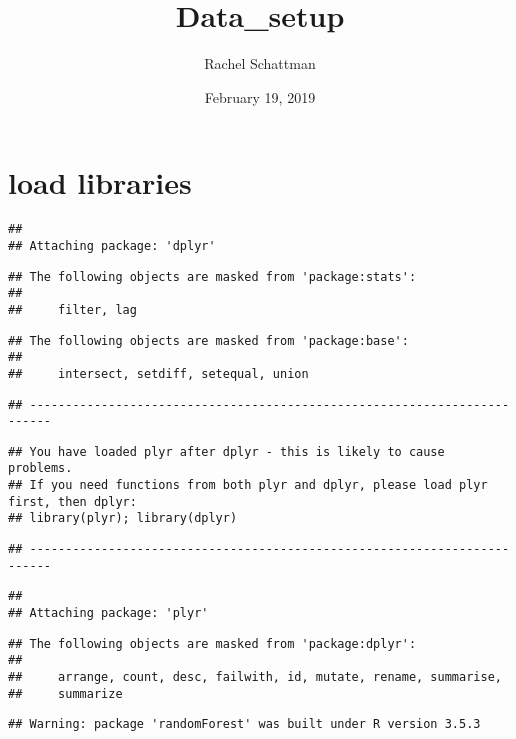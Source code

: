 \documentclass[]{article}
\title{Data\_setup}
\author{Rachel Schattman}
\date{February 19, 2019}
\begin{document}
\maketitle

\section{load libraries}\label{load-libraries}

\begin{verbatim}
## 
## Attaching package: 'dplyr'
\end{verbatim}

\begin{verbatim}
## The following objects are masked from 'package:stats':
## 
##     filter, lag
\end{verbatim}

\begin{verbatim}
## The following objects are masked from 'package:base':
## 
##     intersect, setdiff, setequal, union
\end{verbatim}

\begin{verbatim}
## -------------------------------------------------------------------------
\end{verbatim}

\begin{verbatim}
## You have loaded plyr after dplyr - this is likely to cause problems.
## If you need functions from both plyr and dplyr, please load plyr first, then dplyr:
## library(plyr); library(dplyr)
\end{verbatim}

\begin{verbatim}
## -------------------------------------------------------------------------
\end{verbatim}

\begin{verbatim}
## 
## Attaching package: 'plyr'
\end{verbatim}

\begin{verbatim}
## The following objects are masked from 'package:dplyr':
## 
##     arrange, count, desc, failwith, id, mutate, rename, summarise,
##     summarize
\end{verbatim}

\begin{verbatim}
## Warning: package 'randomForest' was built under R version 3.5.3
\end{verbatim}
\end{document}
